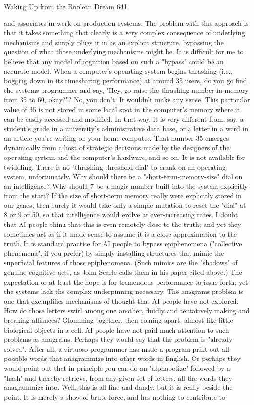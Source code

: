 Waking Up from the Boolean Dream                                                        641

and associates in work on production systems. The problem with this approach is that
it takes something that clearly is a very complex consequence of underlying
mechanisms and simply plugs it in as an explicit structure, bypassing the question of
what those underlying mechanisms might be. It is difficult for me to believe that any
model of cognition based on such a "bypass" could be an accurate model.
         When a computer's operating system begins thrashing (i.e., bogging down in
its timesharing performance) at around 35 users, do you go find the systems
programmer and say, "Hey, go raise the thrashing-number in memory from 35 to 60,
okay?"? No, you don't. It wouldn't make any sense. This particular value of 35 is not
stored in some local spot in the computer's memory where it can be easily accessed
and modified. In that way, it is very different from, say, a student's grade in a
university's administrative data base, or a letter in a word in an article you're writing
on your home computer. That number 35 emerges dynamically from a host of
strategic decisions made by the designers of the operating system and the computer's
hardware, and so on. It is not available for twiddling. There is no "thrashing-threshold
dial" to crank on an operating system, unfortunately.
         Why should there be a "short-term-memory-size" dial on an intelligence? Why
should 7 be a magic number built into the system explicitly from the start? If the size
of short-term memory really were explicitly stored in our genes, then surely it would
take only a simple mutation to reset the "dial" at 8 or 9 or 50, so that intelligence
would evolve at ever-increasing rates. I doubt that AI people think that this is even
remotely close to the truth; and yet they sometimes act as if it made sense to assume it
is a close approximation to the truth.
         It is standard practice for AI people to bypass epiphenomena ("collective
phenomena", if you prefer) by simply installing structures that mimic the superficial
features of those epiphenomena. (Such mimics are the "shadows" of genuine
cognitive acts, as John Searle calls them in his paper cited above.) The expectation-or
at least the hope-is for tremendous performance to issue forth; yet the systems lack the
complex underpinning necessary.
         The anagrams problem is one that exemplifies mechanisms of thought that AI
people have not explored. How do those letters swirl among one another, fluidly and
tentatively making and breaking alliances? Glomming together, then coming apart,
almost like little biological objects in a cell. AI people have not paid much attention to
such problems as anagrams. Perhaps they would say that the problem is "already
solved". After all, a virtuoso programmer has made a program print out all possible
words that anagrammize into other words in English. Or perhaps they would point out
that in principle you can do an "alphabetize" followed by a "hash" and thereby
retrieve, from any given set of letters, all the words they anagrammize into. Well, this
is all fine and dandy, but it is really beside the point. It is merely a show of brute
force, and has nothing to contribute to




